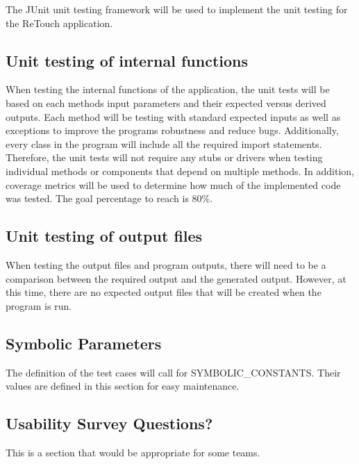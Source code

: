 \documentclass[12pt, titlepage]{article}
\begin{document}
The JUnit unit testing framework will be used to implement the unit testing for the ReTouch application.
		
\subsection{Unit testing of internal functions}

When testing the internal functions of the application, the unit tests will be based on each methods input parameters and their expected versus derived outputs. Each method will be testing with standard expected inputs as well as exceptions to improve the programs robustness and reduce bugs. Additionally, every class in the program will include all the required import statements. Therefore, the unit tests will not require any stubs or drivers when testing individual methods or components that depend on multiple methods. In addition, coverage metrics will be used to determine how much of the implemented code was tested. The goal percentage to reach is 80\%. 
		
\subsection{Unit testing of output files}

When testing the output files and program outputs, there will need to be a comparison between the required output and the generated output. However, at this time, there are no expected output files that will be created when the program is run. 		





\newpage

\subsection{Symbolic Parameters}

The definition of the test cases will call for SYMBOLIC\_CONSTANTS.
Their values are defined in this section for easy maintenance.

\subsection{Usability Survey Questions?}

This is a section that would be appropriate for some teams.
\end{document}
